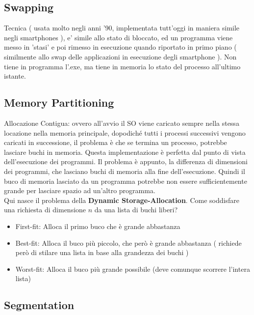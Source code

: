 \documentclass[12pt, a4paper]{article}
\begin{document}
	
	\subsection*{Swapping}
	
	Tecnica ( usata molto negli anni '90, implementata tutt'oggi in maniera simile negli smartphones ), e' simile allo stato di bloccato, ed un programma viene messo in 'stasi' e poi rimesso in esecuzione quando riportato in primo piano ( similmente allo swap delle applicazioni in esecuzione degli smartphone ). Non tiene in programma l'.exe, ma tiene in memoria lo stato del processo all'ultimo istante. 
	
	\subsection*{Memory Partitioning}
	
	Allocazione Contigua: ovvero all'avvio il SO viene caricato sempre nella stessa locazione nella memoria principale, dopodiché tutti i processi successivi vengono caricati in successione, il problema è che se termina un processo, potrebbe lasciare buchi in memoria. Questa implementazione è perfetta dal punto di vista dell'esecuzione dei programmi. Il problema è appunto, la differenza di dimensioni dei programmi, che lasciano buchi di memoria alla fine dell'esecuzione. Quindi il buco di memoria lasciato da un programma potrebbe non essere sufficientemente grande per lasciare spazio ad un'altro programma.  \\
	Qui nasce il problema della \textbf{Dynamic Storage-Allocation}. Come soddisfare una richiesta di dimensione $n$ da una lista di buchi liberi?
	\begin{itemize}
		\item First-fit: Alloca il primo buco che è grande abbastanza
		\item Best-fit: Alloca il buco più piccolo, che però è grande abbastanza ( richiede però di stilare una lista in base alla grandezza dei buchi )
		\item Worst-fit: Alloca il buco più grande possibile (deve comunque scorrere l'intera lista)
	\end{itemize}
	
	\subsection*{Segmentation}
	
\end{document}
